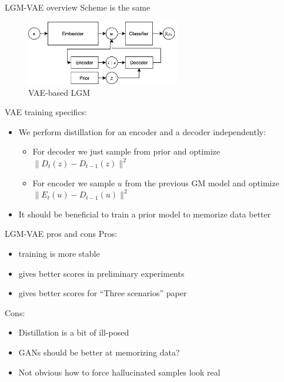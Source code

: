 \documentclass[handout, 10pt]{beamer}
\begin{document}
\begin{frame}{LGM-VAE overview}
    Scheme is the same
    \begin{figure}
        \centering
        \includegraphics[width=0.6\textwidth]{images/LGM-VAE}
        \caption{VAE-based LGM}
    \end{figure}
    
    \pause
    VAE training specifics:
    \begin{itemize}
        \item\pause We perform distillation for an encoder and a decoder independently:
        \begin{itemize}
            \item For decoder we just sample from prior and optimize $\| D_t(z) - D_{t-1}(z)\|^2$
            \item For encoder we sample $u$ from the previous GM model and optimize $\| E_t(u) - D_{t-1}(u)\|^2$
        \end{itemize}
        \item\pause It should be beneficial to train a prior model to memorize data better
    \end{itemize}
\end{frame}


\begin{frame}{LGM-VAE pros and cons}
    Pros:
    \begin{itemize}
        \item training is more stable
        \item gives better scores in preliminary experiments
        \item gives better scores for ``Three scenarios'' paper
    \end{itemize}
    
    Cons:
    \begin{itemize}
        \item Distillation is a bit of ill-posed
        \item GANs should be better at memorizing data?
        \item Not obvious how to force hallucinated samples look real
    \end{itemize}
\end{frame}
\end{document}

